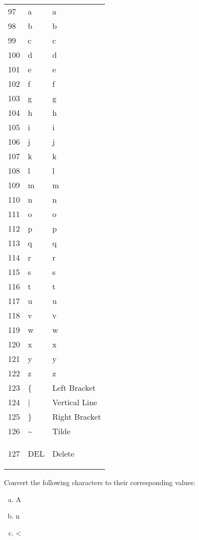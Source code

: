 \begin{description}
\begin{longtable}{lll}
      97 & a & a \\
      98 & b & b \\
      99 & c & c \\
      100 & d & d \\
      101 & e & e \\
      102 & f & f \\
      103 & g & g \\
      104 & h & h \\
      105 & i & i \\
      106 & j & j \\
      107 & k & k \\
      108 & l & l \\
      109 & m & m \\
      110 & n & n \\
      111 & o & o \\
      112 & p & p \\
      113 & q & q \\
      114 & r & r \\
      115 & s & s \\
      116 & t & t \\
      117 & u & u \\
      118 & v & v \\
      119 & w & w \\
      120 & x & x \\
      121 & y & y \\
      122 & z & z \\

      123 & \{ & Left Bracket \\
      124 & | & Vertical Line \\
      125 & \} & Right Bracket \\
      126 & \textasciitilde & Tilde \\
      127 & DEL & Delete

      \label{tab:ascii-table}

    \end{longtable}

  \begin{Exercise}[label={ascii-to-num}]
    Convert the following \ascii characters to their corresponding \ascii
    values:

    \begin{enumerate}[(a)]
    \item A
    \item n
    \item <
    \end{enumerate}
  \end{Exercise}


\end{description}
